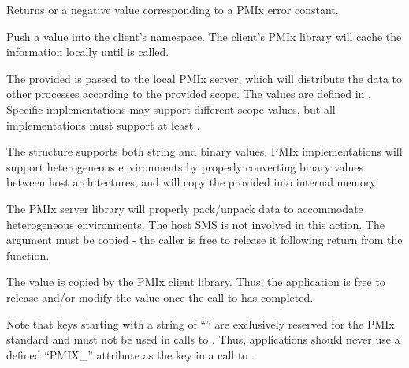 \begin{arglist}
\end{arglist}

Returns  or a negative value corresponding to a PMIx error constant.

\descr

Push a value into the client's namespace.
The client's \ac{PMIx} library will cache the information locally until  is called.

The provided  is passed to the local PMIx server, which will distribute the data to other processes according to the provided scope.
The  values are defined in .
Specific implementations may support different scope values, but all implementations must support at least .

The  structure supports both string and binary values.
PMIx implementations will support heterogeneous environments by properly converting binary values between host architectures, and will copy the provided  into internal memory.

\adviceimplstart
The PMIx server library will properly pack/unpack data to accommodate heterogeneous environments. The host \ac{SMS} is not involved in this action. The  argument must be copied - the caller is free to release it following return from the function.
\adviceimplend

\adviceuserstart
The value is copied by the PMIx client library. Thus, the application is free to release and/or modify the value once the call to  has completed.

Note that keys starting with a string of ``'' are exclusively reserved for the \ac{PMIx} standard and must not be used in calls to . Thus, applications should never use a defined ``PMIX_'' attribute as the key in a call to .
\adviceuserend


\subsection{}

\summary

